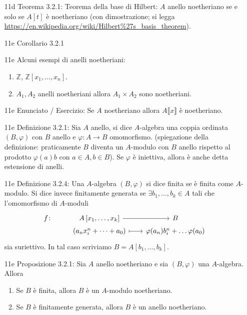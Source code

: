 \documentclass[italian]{article}
\begin{document}
	\begin{enumerate}
      \item[11d] Teorema 3.2.1: Teorema della base di Hilbert: $A$ anello
        noetheriano se e solo se $A\left[t\right]$ è noetheriano (con
        dimostrazione; si legga 
        \url{https://en.wikipedia.org/wiki/Hilbert\%27s_basis_theorem}). 
      \item[11e] Corollario 3.2.1 
      \item[11e] Alcuni esempi di anelli noetheriani: 
        \begin{enumerate}
          \item $\mathbb{Z}$, $\mathbb{Z}\left[x_1, \dots,x_n\right]$.
          \item $A_1, A_2$ anelli noetheriani allora $A_1 \times A_2$ sono
            noetheriani. 
        \end{enumerate}
      \item[11e] Enunciato / Esercizio: Se $A$ noetheriano allora $A\llbracket x \rrbracket$ 
        è noetheriano.
      \item[11e] Definizione 3.2.1: Sia $A$ anello, si dice $A$-algebra una
        coppia ordinata $(B,\varphi)$ con $B$ anello e $\varphi \colon A \to B$
        omomorfismo. (spiegazione della definizione: praticamente $B$ diventa un
        $A$-modulo con $B$ anello rispetto al prodotto $\varphi(a) b$ con $a \in
        A, b\in B$). Se $\varphi$ è iniettiva, allora è anche detta estensione di
        anelli.
      \item[11e] Definizione 3.2.4: Una $A$-algebra $(B, \varphi)$ si dice
        finita se è finita come $A$-modulo. Si dice invece finitamente generata
        se $\exists b_1, \dots, b_k \in A$ tali che l'omomorfismo di $A$-moduli
        \begin{equation*}
        	\begin{tikzcd}[row sep=0.1em, column sep = 2em]
        		f \colon   & A\left[ x_1, \dots,x_k \right] \arrow{r} & B \\
        	 			& (a_n x_i^n + \dots + a_0) \arrow[r, maps to] 
        	 			& \varphi(a_n)b^n_i + \dots \varphi(a_0)		
        	\end{tikzcd}
        \end{equation*}
        sia suriettivo. In tal caso scriviamo $B = A\left[ b_1, \dots, b_k
        \right]$.
      \item[11e] Proposizione 3.2.1: Sia $A$ anello noetheriano e sia
        $(B,\varphi)$ una $A$-algebra. Allora
        \begin{enumerate}
          \item Se $B$ è finita, allora $B$ è un $A$-modulo noetheriano.
          \item Se $B$ è finitamente generata, allora $B$ è un anello
            noetheriano.
        \end{enumerate}
	\end{enumerate}
   
\end{document}
